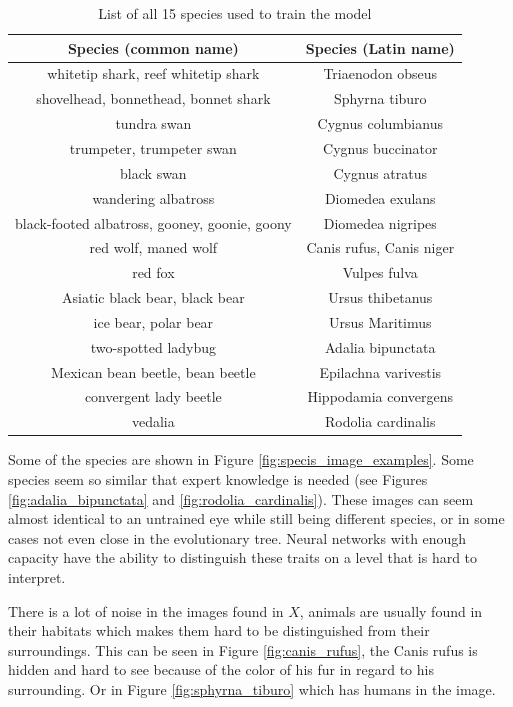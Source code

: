 \documentclass[times, utf8, diplomski]{fer}
\begin{document}
\begin{table}
\centering
\caption{List of all 15 species used to train the model}
\label{tb:species_list}
\begin{tabular}{cc}
\hline 
Species (common name) & Species (Latin name)\\ \hline 
whitetip shark, reef whitetip shark & Triaenodon obseus \\
shovelhead, bonnethead, bonnet shark & Sphyrna tiburo \\
tundra swan & Cygnus columbianus \\
trumpeter, trumpeter swan & Cygnus buccinator \\
black swan & Cygnus atratus \\
wandering albatross & Diomedea exulans \\
black-footed albatross, gooney, goonie, goony & Diomedea nigripes \\
red wolf, maned wolf & Canis rufus, Canis niger \\
red fox & Vulpes fulva \\
Asiatic black bear, black bear & Ursus thibetanus\\
ice bear, polar bear & Ursus Maritimus \\
two-spotted ladybug & Adalia bipunctata \\
Mexican bean beetle, bean beetle & Epilachna varivestis \\
convergent lady beetle & Hippodamia convergens \\
vedalia & Rodolia cardinalis \\
\hline 
\end{tabular} 
\end{table}

Some of the species are shown in Figure \ref{fig:specis_image_examples}. Some species seem so similar that expert knowledge is needed (see Figures \ref{fig:adalia_bipunctata} and \ref{fig:rodolia_cardinalis}). These images can seem almost identical to an untrained eye while still being different species, or in some cases not even close in the evolutionary tree. Neural networks with enough capacity have the ability to distinguish these traits on a level that is hard to interpret.

There is a lot of noise in the images found in $X$, animals are usually found in their habitats which makes them hard to be distinguished from their surroundings. This can be seen in Figure \ref{fig:canis_rufus}, the Canis rufus is hidden and hard to see because of the color of his fur in regard to his surrounding. Or in Figure \ref{fig:sphyrna_tiburo} which has humans in the image.
\end{document}
